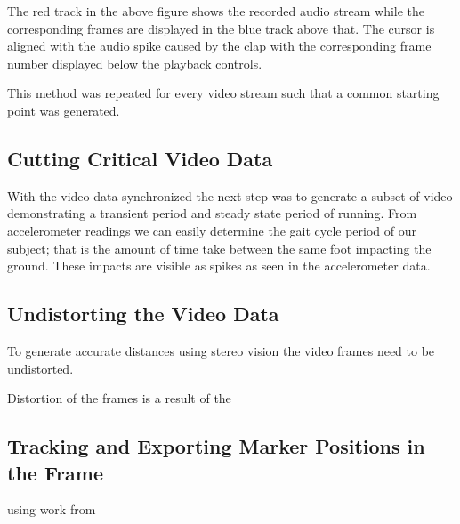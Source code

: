 The red track in the above figure shows the recorded audio stream while the corresponding frames are displayed in the blue track above that. The cursor is aligned with the audio spike caused by the clap with the corresponding frame number displayed below the playback controls.

This method was repeated for every video stream such that a common starting point was generated. 

\subsection{Cutting Critical Video Data}

With the video data synchronized the next step was to generate a subset of video demonstrating a transient period and steady state period of running. From accelerometer readings we can easily determine the gait cycle period of our subject; that is the amount of time take between the same foot impacting the ground. These impacts are visible as spikes as seen in the accelerometer data.  

\subsection{Undistorting the Video Data}
To generate accurate distances using stereo vision the video frames need to be undistorted.

Distortion of the frames is a result of the 

\cite{Hartley2004} 

\subsection{Tracking and Exporting Marker Positions in the Frame}

using work from \cite{hedrick2008software}












